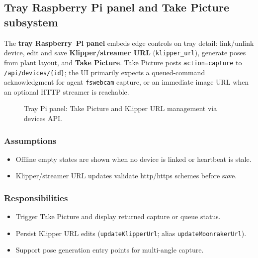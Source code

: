 \subsection{Tray Raspberry Pi panel and Take Picture subsystem}

The \textbf{tray Raspberry~Pi panel} embeds edge controls on tray detail: link/unlink device, edit and save \textbf{Klipper/streamer URL} (\texttt{klipper\_url}), generate poses from plant layout, and \textbf{Take Picture}. Take Picture posts \texttt{action=capture} to \texttt{/api/devices/\{id\}}; the UI primarily expects a queued-command acknowledgment for agent \texttt{fswebcam} capture, or an immediate image URL when an optional HTTP streamer is reachable.

\begin{figure}[H]
\centering
{}
\caption{Tray Pi panel: Take Picture and Klipper URL management via devices API.}
\label{fig:pres-pi-panel}
\end{figure}

\subsubsection{Assumptions}
\begin{itemize}
  \item Offline empty states are shown when no device is linked or heartbeat is stale.
  \item Klipper/streamer URL updates validate http/https schemes before save.
\end{itemize}

\subsubsection{Responsibilities}
\begin{itemize}
  \item Trigger Take Picture and display returned capture or queue status.
  \item Persist Klipper URL edits (\texttt{updateKlipperUrl}; alias \texttt{updateMoonrakerUrl}).
  \item Support pose generation entry points for multi-angle capture.
\end{itemize}

